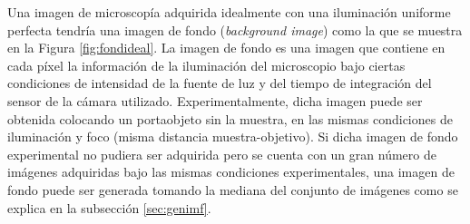 	\begin{figure}[H]
		\begin{floatrow}
		\end{floatrow}
	\end{figure}
	
Una imagen de microscopía adquirida idealmente con una iluminación uniforme perfecta tendría una imagen de fondo (\textit{background image}) como la que se muestra en la Figura \ref{fig:fondideal}. La imagen de fondo es una imagen que contiene en cada píxel la información de la iluminación del microscopio bajo ciertas condiciones de intensidad de la fuente de luz y del tiempo de integración del sensor de la cámara utilizado. Experimentalmente, dicha imagen puede ser obtenida colocando un portaobjeto sin la muestra, en las mismas condiciones de iluminación y foco (misma distancia muestra-objetivo). Si dicha imagen de fondo experimental no pudiera ser adquirida pero se cuenta con un gran número de imágenes adquiridas bajo las mismas condiciones experimentales, una imagen de fondo puede ser generada tomando la mediana del conjunto de imágenes como se explica en la subsección \ref{sec:genimf}.

